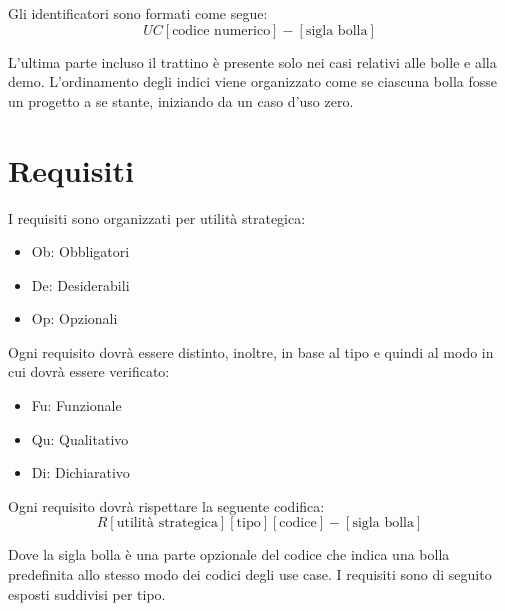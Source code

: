 Gli identificatori sono formati come segue:
$$
UC[\text{codice numerico}]-[\text{sigla
    bolla}]
$$

L'ultima parte incluso il trattino è presente solo nei casi relativi alle
 bolle e alla demo.
L'ordinamento degli indici viene organizzato come se ciascuna bolla
fosse un progetto a se stante, iniziando da un caso d'uso zero.


\clearpage







\section{Requisiti}

I requisiti sono organizzati per utilità strategica:
\begin{itemize}
\item Ob: Obbligatori
\item De: Desiderabili
\item Op: Opzionali
\end{itemize}
Ogni requisito dovrà essere distinto, inoltre, in base al tipo e quindi al modo in cui dovrà essere verificato:
\begin{itemize}
\item Fu: Funzionale
\item Qu: Qualitativo
\item Di: Dichiarativo
\end{itemize}
Ogni requisito dovrà rispettare la seguente codifica:
$$
R[\text{utilità strategica}][\text{tipo}][\text{codice}]-[\text{sigla
    bolla}]
$$

Dove la sigla bolla è una parte opzionale del codice che indica una
bolla predefinita allo stesso modo dei codici degli use case.
I requisiti sono di seguito esposti suddivisi per tipo.



